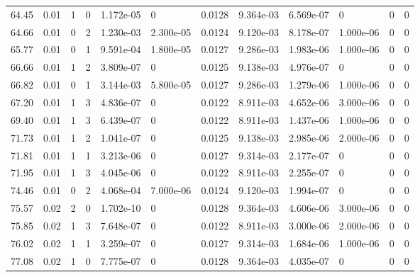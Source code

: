 \documentclass[preview]{standalone}
\begin{document}
{{{\begin{tabular}{L{1.2cm}C{1.2cm} C{0.3cm}C{0.5cm} C{1.4cm}C{1.4cm} C{1.4cm}C{1.4cm} C{1.6cm}C{1.6cm} C{1.6cm}C{1.6cm}}
  64.45  &  0.01  & 1     &  0 &  1.172e-05  & 0  &  0.0128&   9.364e-03& 6.569e-07 & 0   &  0 & 0  \\ 
  64.66  &  0.01  & 0     &  2 &  1.230e-03  & 2.300e-05  &  0.0124&   9.120e-03& 8.178e-07 & 1.000e-06   &  0 & 0  \\ 
  65.77  &  0.01  & 0     &  1 &  9.591e-04  & 1.800e-05  &  0.0127&   9.286e-03& 1.983e-06 & 1.000e-06   &  0 & 0  \\ 
  66.66  &  0.01  & 1     &  2 &  3.809e-07  & 0  &  0.0125&   9.138e-03& 4.976e-07 & 0   &  0 & 0  \\ 
  66.82  &  0.01  & 0     &  1 &  3.144e-03  & 5.800e-05  &  0.0127&   9.286e-03& 1.279e-06 & 1.000e-06   &  0 & 0  \\ 
  67.20  &  0.01  & 1     &  3 &  4.836e-07  & 0  &  0.0122&   8.911e-03& 4.652e-06 & 3.000e-06   &  0 & 0  \\ 
  69.40  &  0.01  & 1     &  3 &  6.439e-07  & 0  &  0.0122&   8.911e-03& 1.437e-06 & 1.000e-06   &  0 & 0  \\ 
  71.73  &  0.01  & 1     &  2 &  1.041e-07  & 0  &  0.0125&   9.138e-03& 2.985e-06 & 2.000e-06   &  0 & 0  \\ 
  71.81  &  0.01  & 1     &  1 &  3.213e-06  & 0  &  0.0127&   9.314e-03& 2.177e-07 & 0   &  0 & 0  \\ 
  71.95  &  0.01  & 1     &  3 &  4.045e-06  & 0  &  0.0122&   8.911e-03& 2.255e-07 & 0   &  0 & 0  \\ 
  74.46  &  0.01  & 0     &  2 &  4.068e-04  & 7.000e-06  &  0.0124&   9.120e-03& 1.994e-07 & 0   &  0 & 0  \\ 
  75.57  &  0.02  & 2     &  0 &  1.702e-10  & 0  &  0.0128&   9.364e-03& 4.606e-06 & 3.000e-06   &  0 & 0  \\ 
  75.85  &  0.02  & 1     &  3 &  7.648e-07  & 0  &  0.0122&   8.911e-03& 3.000e-06 & 2.000e-06   &  0 & 0  \\ 
  76.02  &  0.02  & 1     &  1 &  3.259e-07  & 0  &  0.0127&   9.314e-03& 1.684e-06 & 1.000e-06   &  0 & 0  \\ 
  77.08  &  0.02  & 1     &  0 &  7.775e-07  & 0  &  0.0128&   9.364e-03& 4.035e-07 & 0   &  0 & 0  \\ 
\hline 
\end{tabular} 

}}}
\end{document}

